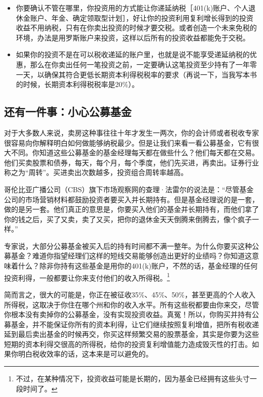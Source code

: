 \begin{itemize}
\item 你要确认不管在哪里，你投资用的方式能让你递延纳税［401(k)账户、个人退休金账户、年金、确定领取型计划］，好让你的投资利用复利增长得到的投资收益不用纳税，只有在你卖出投资的时候才要交税。或者创造一个未来免税的环境，办法是用罗斯账户来投资，这样以后所有的投资收益都能免于交税。
\item 如果你的投资不是在可以税收递延的账户里，也就是说不能享受递延纳税的优惠，那么在你卖出任何一笔投资之前，一定要确认这笔投资至少持有了一年零一天，以确保其符合更低长期资本利得税税率的要求（再说一下，当我写本书的时候，长期资本利得税税率是20\%）。
\end{itemize}

\subsection{还有一件事：小心公募基金}

对于大多数人来说，卖房这种事往往十年才发生一两次，你的会计师或者税收专家很容易向你解释明白如何做能够纳税最少。但是让我们来看一看公募基金，它有很大不同。你知道这些公募基金的基金经理每天都在做些什么？他们每天都在交易。他们买卖股票和债券，每天，每个月，每个季度，他们先买进，再卖出。证券行业称之为“周转”。买进卖出次数越多，投资组合周转率越高。

哥伦比亚广播公司（CBS）旗下市场观察网的查理·法雷尔的说法是：“尽管基金公司的市场营销材料都鼓励投资者要买入并长期持有。但是基金经理说的是一套，做的是另一套。他们真正的意思是，你要买入他们的基金并长期持有，而他们拿了你的钱之后，买了又卖，卖了又买，把你的退休金天天倒腾来倒腾去，像个疯子一样。”

专家说，大部分公募基金被买入后的持有时间都不满一整年。为什么你要买这种公募基金？难道你指望经理们这样的短线交易能够创造出更好的业绩吗？你知道这意味着什么？除非你持有这些基金是用你的401(k)账户，不然的话，基金经理的任何投资利得，一般都要让你来支付他们的收入所得税。\footnote{\label{fn:pdf-19-1}不过，在某种情况下，投资收益可能是长期的，因为基金已经拥有这些头寸一段时间了。}

简而言之，很大的可能是，你正在被征收35\%、45\%、50\%，甚至更高的个人收入所得税，这取决于你住在哪个州和你的收入水平。所有这些税都要由你来交，尽管你根本没有卖掉你的公募基金，没有实现投资收益。真冤！所以，你购买并持有公募基金，并不能保证你所有的资本利得，让它们继续按照复利增值，把所有税收递延到最后卖出基金的时候再交，你买这样频繁交易的股票基金，其实是你要为这些短期的资本利得交很高的所得税，给你的投资复利增值能力造成毁灭性的打击。如果你明白税收效率的话，这本来是可以避免的。

